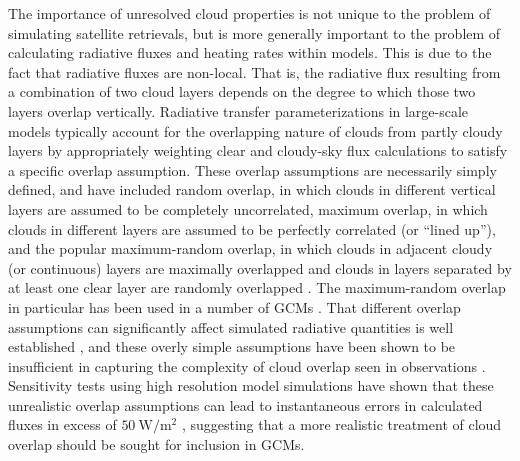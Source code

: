 The importance of unresolved cloud properties is not unique to the
problem of simulating satellite retrievals, but is more generally
important to the problem of calculating radiative fluxes and heating
rates within models. This is due to the fact that radiative fluxes are
non-local. That is, the radiative flux resulting from a combination of
two cloud layers depends on the degree to which those two layers overlap
vertically. Radiative transfer parameterizations in large-scale models
typically account for the overlapping nature of clouds from partly
cloudy layers by appropriately weighting clear and cloudy-sky flux
calculations to satisfy a specific overlap assumption. These overlap
assumptions are necessarily simply defined, and have included random
overlap, in which clouds in different vertical layers are assumed to be
completely uncorrelated, maximum overlap, in which clouds in different
layers are assumed to be perfectly correlated (or ``lined up''), and the
popular maximum-random overlap, in which clouds in adjacent cloudy (or
continuous) layers are maximally overlapped and clouds in layers
separated by at least one clear layer are randomly overlapped
\citep{geleyn_and_hollingsworth_1979, tian_and_curry_1989}. The
maximum-random overlap in particular has been used in a number of GCMs
\citep[e.g.,][]{collins_et_al_2004, neale_et_al_2010a, neale_et_al_2010b}.
That different overlap assumptions can significantly affect simulated
radiative quantities is well established
\citep[e.g.,][]{morcrette_and_fouquart_1986, stubenrauch_et_al_1997, barker_et_al_1999},
and these overly simple assumptions have been shown to be insufficient
in capturing the complexity of cloud overlap seen in observations
\citep{hogan_and_illingworth_2000, mace_and_benson-troth_2002, barker_2008}.
Sensitivity tests using high resolution model simulations have shown
that these unrealistic overlap assumptions can lead to instantaneous
errors in calculated fluxes in excess of \(50~\textrm{W}/\textrm{m}^2\)
\citep{barker_et_al_1999, wu_and_liang_2005}, suggesting that a more
realistic treatment of cloud overlap should be sought for inclusion in
GCMs.

